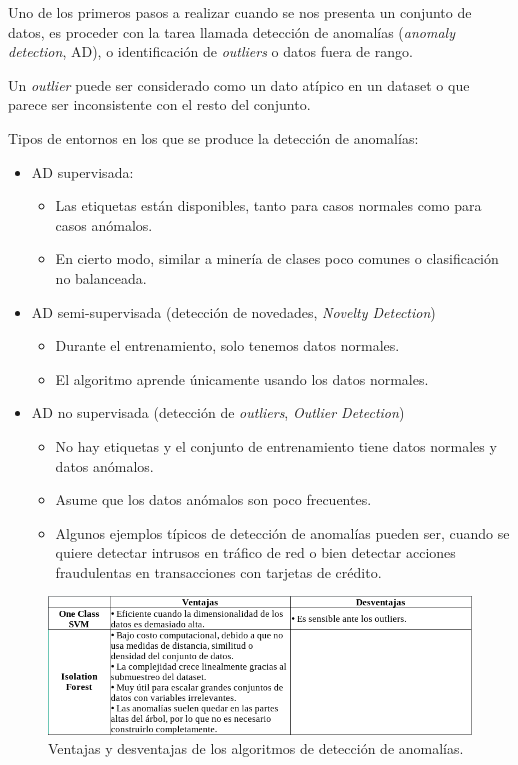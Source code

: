 \documentclass[a4paper,12pt]{article}
\begin{document}
Uno de los primeros pasos a realizar cuando se nos presenta un conjunto de datos, es proceder con la tarea llamada detección de anomalías (\textit{anomaly detection}, AD), o identificación de \textit{outliers} o datos fuera de rango. 

Un \textit{outlier} puede ser considerado como un dato atípico en un dataset o que parece ser inconsistente con el resto del conjunto.

\clearpage

Tipos de entornos en los que se produce la detección de anomalías:
\begin{itemize}[noitemsep, topsep=2pt]
	\item AD supervisada:
	      \begin{itemize}[noitemsep, topsep=2pt]
	      	\item Las etiquetas están disponibles, tanto para casos normales como para casos anómalos.
	      	\item En cierto modo, similar a minería de clases poco comunes o clasificación no balanceada.
	      \end{itemize}
	\item AD semi-supervisada (detección de novedades, \textit{Novelty Detection})
	      \begin{itemize}[noitemsep, topsep=2pt]
	      	\item Durante el entrenamiento, solo tenemos datos normales.
	      	\item El algoritmo aprende únicamente usando los datos normales.
	      \end{itemize}
	\item AD no supervisada (detección de \textit{outliers}, \textit{Outlier Detection})
	      \begin{itemize}[noitemsep, topsep=2pt]
	      	\item No hay etiquetas y el conjunto de entrenamiento tiene datos normales y datos anómalos.
	      	\item Asume que los datos anómalos son poco frecuentes.
	      	\item Algunos ejemplos típicos de detección de anomalías pueden ser, cuando se quiere detectar intrusos en tráfico de red o bien detectar acciones fraudulentas en transacciones con tarjetas de crédito.
	      \end{itemize}
\end{itemize}

\begin{figure}[H]
	\begin{center}				
		\includegraphics[width=1\textwidth]{tesis_11.png}
		\caption{Ventajas y desventajas de los algoritmos de detección de anomalías.}
		\label{fig:proconsanomaly.}
	\end{center}
\end{figure}
\end{document}
